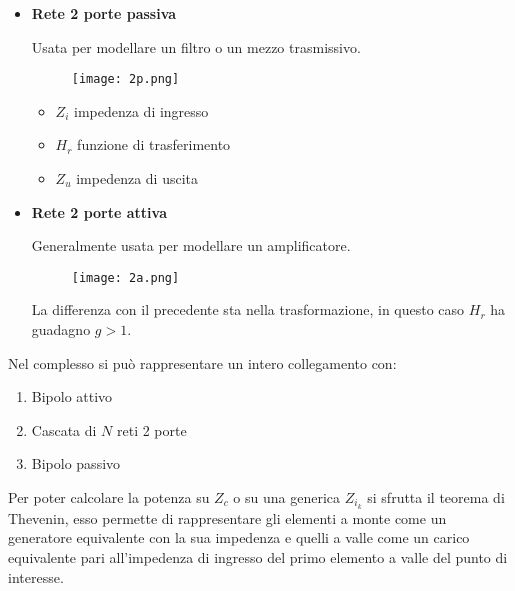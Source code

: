 \documentclass{article}
\begin{document}
\begin{itemize}
    \newpage

    \item \textbf{Rete 2 porte passiva}

        Usata per modellare un filtro o un mezzo trasmissivo.

        \begin{figure}[ht]
            \centering
            \texttt{[image: 2p.png]}
        \end{figure}

        \begin{itemize}
            \item $Z_i$ impedenza di ingresso
            \item $H_r$ funzione di trasferimento
            \item $Z_u$ impedenza di uscita\newline
        \end{itemize}

    \item \textbf{Rete 2 porte attiva}

        Generalmente usata per modellare un amplificatore.

        \begin{figure}[ht]
            \centering
            \texttt{[image: 2a.png]}
        \end{figure}

        La differenza con il precedente sta nella trasformazione, in questo caso $H_r$ ha guadagno $g>1$.\newline
    
\end{itemize}

\noindent Nel complesso si può rappresentare un intero collegamento con:
\begin{enumerate}
    \item Bipolo attivo
    \item Cascata di $N$ reti 2 porte
    \item Bipolo passivo\newline
\end{enumerate}

\noindent Per poter calcolare la potenza su $Z_c$ o su una generica $Z_{i_k}$ si sfrutta il teorema di Thevenin, esso permette di rappresentare gli elementi a monte come un generatore equivalente con la sua impedenza e quelli a valle come un carico equivalente pari all’impedenza di ingresso del primo elemento a valle del punto di interesse.
\end{document}
